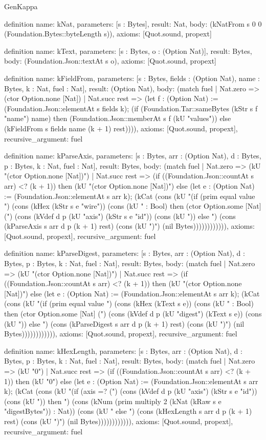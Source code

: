 \begin{lexlean}{GenKappa}
\begin{semanticmodule}
definition{
  name: kNat,
  parameters: [s : Bytes],
  result: Nat,
  body: (kNatFrom s 0 0 (Foundation.Bytes::byteLength s)),
  axioms: [Quot.sound, propext]
}

definition{
  name: kText,
  parameters: [s : Bytes, o : (Option Nat)],
  result: Bytes,
  body: (Foundation.Json::textAt s o),
  axioms: [Quot.sound, propext]
}

definition{
  name: kFieldFrom,
  parameters: [s : Bytes, fields : (Option Nat), name : Bytes, k : Nat, fuel : Nat],
  result: (Option Nat),
  body: (match fuel
    | Nat.zero => (ctor Option.none [Nat])
    | Nat.succ rest => (let f : (Option Nat) := (Foundation.Json::elementAt s fields k); (if (Foundation.Tar::sameBytes (kStr s f "name") name) then (Foundation.Json::memberAt s f (kU "values")) else (kFieldFrom s fields name (k + 1) rest)))),
  axioms: [Quot.sound, propext],
  recursive_argument: fuel
}

definition{
  name: kParseAxis,
  parameters: [s : Bytes, arr : (Option Nat), d : Bytes, p : Bytes, k : Nat, fuel : Nat],
  result: Bytes,
  body: (match fuel
    | Nat.zero => (kU "(ctor Option.none [Nat])")
    | Nat.succ rest => (if ((Foundation.Json::countAt s arr) <? (k + 1)) then (kU "(ctor Option.none [Nat])") else (let e : (Option Nat) := (Foundation.Json::elementAt s arr k); (kCat (cons (kU "(if (prim equal value ") (cons (kHex (kStr s e "wire")) (cons (kU " : Bool) then (ctor Option.some [Nat] (") (cons (kVdef d p (kU "axis") (kStr s e "id")) (cons (kU ")) else ") (cons (kParseAxis s arr d p (k + 1) rest) (cons (kU ")") (nil Bytes)))))))))))),
  axioms: [Quot.sound, propext],
  recursive_argument: fuel
}

definition{
  name: kParseDigest,
  parameters: [s : Bytes, arr : (Option Nat), d : Bytes, p : Bytes, k : Nat, fuel : Nat],
  result: Bytes,
  body: (match fuel
    | Nat.zero => (kU "(ctor Option.none [Nat])")
    | Nat.succ rest => (if ((Foundation.Json::countAt s arr) <? (k + 1)) then (kU "(ctor Option.none [Nat])") else (let e : (Option Nat) := (Foundation.Json::elementAt s arr k); (kCat (cons (kU "(if (prim equal value ") (cons (kHex (kText s e)) (cons (kU " : Bool) then (ctor Option.some [Nat] (") (cons (kVdef d p (kU "digest") (kText s e)) (cons (kU ")) else ") (cons (kParseDigest s arr d p (k + 1) rest) (cons (kU ")") (nil Bytes)))))))))))),
  axioms: [Quot.sound, propext],
  recursive_argument: fuel
}

definition{
  name: kHexLength,
  parameters: [s : Bytes, arr : (Option Nat), d : Bytes, p : Bytes, k : Nat, fuel : Nat],
  result: Bytes,
  body: (match fuel
    | Nat.zero => (kU "0")
    | Nat.succ rest => (if ((Foundation.Json::countAt s arr) <? (k + 1)) then (kU "0") else (let e : (Option Nat) := (Foundation.Json::elementAt s arr k); (kCat (cons (kU "(if (axis =? (") (cons (kVdef d p (kU "axis") (kStr s e "id")) (cons (kU ")) then ") (cons (kNum (prim multiply 2 (kNat (kRaw s e "digestBytes")) : Nat)) (cons (kU " else ") (cons (kHexLength s arr d p (k + 1) rest) (cons (kU ")") (nil Bytes)))))))))))),
  axioms: [Quot.sound, propext],
  recursive_argument: fuel
}


\end{semanticmodule}
\end{lexlean}
